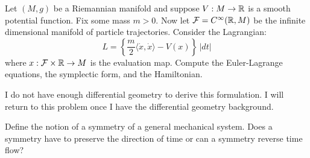 \documentclass{pset}
\begin{document}
\begin{problem}{4}
    Let $(M, g)$ be a Riemannian manifold and suppose $V: M \to \mathbb{R}$ is a smooth potential function. Fix some mass $m>0$. Now let $\mathcal{F}=C^\infty(\mathbb{R}, M)$ be the infinite dimensional manifold of particle trajectories. Consider the Lagrangian:
    \[
        L = \left\{ \frac{m}{2}\big\langle \dot{x},\dot{x} \big\rangle - V(x)\right\}\,|dt|
    \]
    where $x : \mathcal{F}\times \mathbb{R}\to M$ is the evaluation map. Compute the Euler-Lagrange equations, the symplectic form, and the Hamiltonian.
\end{problem}

\begin{solution}
    I do not have enough differential geometry to derive this formulation. I will return to this problem once I have the differential geometry background.
\end{solution}

\begin{problem}{5}
    Define the notion of a symmetry of a general mechanical system. Does a symmetry have to preserve the direction of time or can a symmetry reverse time flow?
\end{problem}
\end{document}
